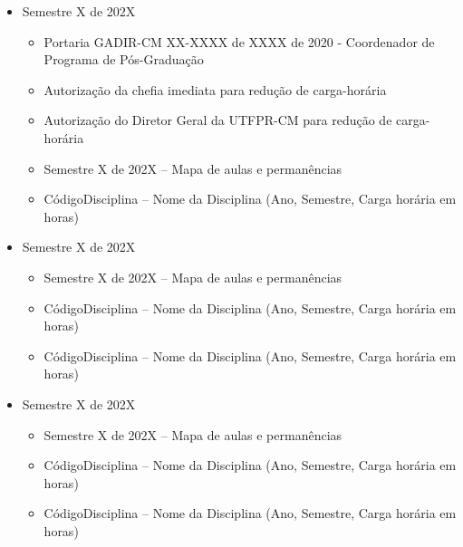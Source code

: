 \begin{itemize}
    \item Semestre X de 202X
    \begin{itemize}
        \item Portaria GADIR-CM XX-XXXX de XXXX de 2020 - Coordenador de Programa de Pós-Graduação

        \item Autorização da chefia imediata para redução de carga-horária

        \item Autorização do Diretor Geral da UTFPR-CM para redução de carga-horária

        \item Semestre X de 202X -- Mapa de aulas e permanências
        
        \item CódigoDisciplina -- Nome da Disciplina (Ano, Semestre, Carga horária em horas)
    \end{itemize}
    
    \item Semestre X de 202X
    \begin{itemize}
        \item Semestre X de 202X -- Mapa de aulas e permanências

        \item CódigoDisciplina -- Nome da Disciplina (Ano, Semestre, Carga horária em horas)

        \item CódigoDisciplina -- Nome da Disciplina (Ano, Semestre, Carga horária em horas)
    \end{itemize}
        
    \item Semestre X de 202X
    \begin{itemize}
        \item Semestre X de 202X -- Mapa de aulas e permanências

        \item CódigoDisciplina -- Nome da Disciplina (Ano, Semestre, Carga horária em horas)

        \item CódigoDisciplina -- Nome da Disciplina (Ano, Semestre, Carga horária em horas)
    \end{itemize}


\end{itemize}
